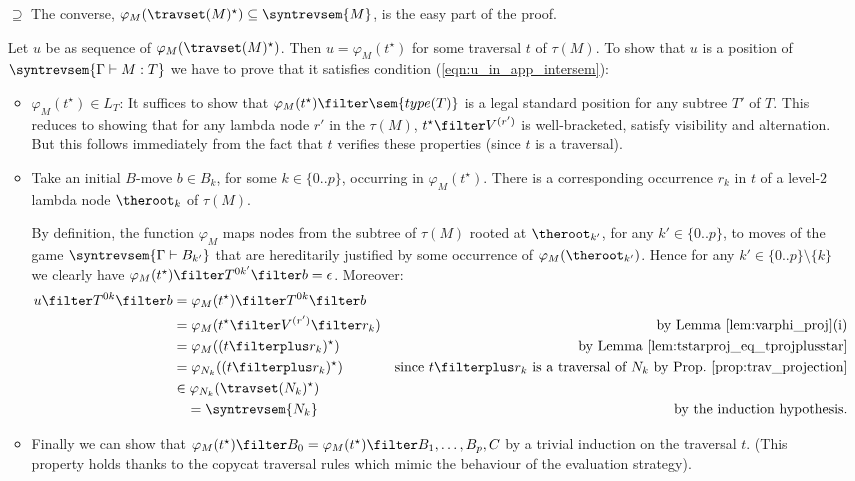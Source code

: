 \begin{itemize}[$\bullet$]
\begin{enumerate}
\begin{itemize}
    \end{itemize}

\item[$\supseteq$]
  The converse, $\varphi_{M}( \travset(M)^\star) \subseteq \syntrevsem{M}$, is the easy part of the proof.

  Let $u$ be as sequence of $\varphi_{M}( \travset(M)^\star)$. Then
  $u = \varphi_{M}(t^\star)$ for some traversal $t$ of $\tau(M)$. To show that
  $u$ is a position of $\syntrevsem{\Gamma \vdash M : T}$ we have to prove that it satisfies condition (\ref{eqn:u_in_app_intersem}):
\begin{itemize}
    \item $\varphi_{M}(t^\star) \in L_T$: It suffices to show that $\varphi_{M}(t^\star) \filter \sem{type(T)}$ is a legal
    standard position for any subtree $T'$ of $T$. This reduces to showing that for any lambda node $r'$ in the $\tau(M)$,
    $t^\star \filter V^{(r')}$ is well-bracketed, satisfy visibility and alternation. But this follows immediately from the fact that $t$ verifies these properties (since $t$ is a traversal).

    \item Take an initial $B$-move $b \in B_k$, for some $k\in\{0..p\}$, occurring in $\varphi_{M}(t^\star)$. There is a corresponding occurrence $r_k$ in $t$ of a level-$2$ lambda node $\theroot_k$ of $\tau(M)$.

    By definition, the function $\varphi_{M}$ maps nodes from the subtree of $\tau(M)$ rooted at $\theroot_{k'}$, for any $k'\in \{0..p\}$, to moves of the game $\syntrevsem{\Gamma \vdash B_{k'}}$ that are hereditarily justified by some occurrence of $\varphi_M(\theroot_{k'})$.
    Hence for any $k'\in \{0..p\}\setminus\{k\}$ we clearly have $\varphi_{M}(t^\star) \filter T^{0k'} \filter b = \epsilon$.
    Moreover:
    \begin{align*}
        u \filter T^{0k}\filter b &= \varphi_{M}(t^\star) \filter T^{0k}\filter b \\
         &= \varphi_{M}(t^\star \filter V^{(r')} \filter r_k ) & \mbox{by Lemma \ref{lem:varphi_proj}(i)} \\
         &= \varphi_{M}((t\filterplus r_k)^\star) & \mbox{by Lemma \ref{lem:tstarproj_eq_tprojplusstar}} \\
         &= \varphi_{N_k}((t\filterplus r_k)^\star) & \mbox{since $t\filterplus r_k$ is a traversal of $N_k$ by Prop.\ \ref{prop:trav_projection}} \\
         &\in \varphi_{N_k}(\travset(N_k)^\star) \\
         &\quad = \syntrevsem{N_k} & \mbox{by the induction hypothesis.}
    \end{align*}
    \item  Finally we can show that $\varphi_{M}(t^\star) \filter B_0 = \varphi_{M}(t^\star) \filter B_1, \ldots, B_p, C$ by a trivial induction on the traversal $t$. (This property holds thanks to the copycat traversal rules which mimic the behaviour of the evaluation strategy).
    \end{itemize}


\end{enumerate}
\end{itemize}
